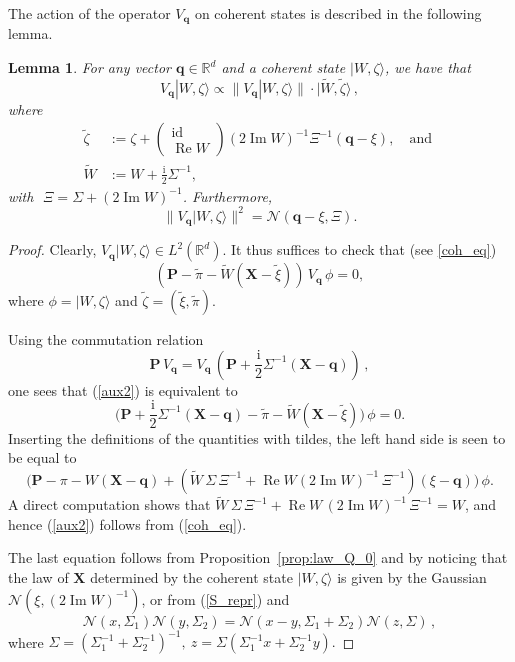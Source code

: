\documentclass[11pt]{article}
\newtheorem{lemma}[theorem]{Lemma}
\newcommand{\ket}[1]{|{#1}\rangle}
\renewcommand{\Re}{\operatorname{Re}}
\renewcommand{\Im}{\operatorname{Im}}
\renewcommand\i{\mathrm{i}}
\newcommand{\iu}{{\mathrm i}}
\newcommand{\id}{\mathrm{id}}
\begin{document}
The action of the operator $V_{\mathbf q}$ on coherent states is described in the following lemma.
\begin{lemma}
\label{qLemma}
For any vector $\mathbf q\in\mathbb R^d$ and a coherent state $\ket{W, \zeta}$, we have that
$$V_{\mathbf q} \ket{W, \zeta} \propto \|V_{\mathbf q} \ket{W, \zeta}\| \cdot \ket{\tilde{W}, \tilde{\zeta}}\,,$$ 
where
\begin{align*}
\tilde{\zeta}& :=  \zeta + \left(\begin{array}{c} \id \\ \Re W  \end{array} \right) (2\Im W)^{-1} \Xi^{-1}(\mathbf q-\xi), \quad \text{and }\\
 \tilde{W} &:= W + \frac{\iu}{2}\Sigma^{-1},
\end{align*}
with\,\, $\Xi = \Sigma + (2 \Im W)^{-1}$. Furthermore,
$$
\|V_{\mathbf q} \ket{W, \zeta}\|^2 = \mathcal{N}(\mathbf q - \xi, \Xi).
$$
\end{lemma}
\begin{proof}
Clearly, $V_{\mathbf q} \ket{W, \zeta} \in L^2(\mathbb R^d)$. It thus suffices to check  that (see \eqref{coh_eq})
\begin{equation}
\label{aux2}
(\mathbf P - \tilde{\pi} - \tilde{W}(\mathbf X - \tilde{\xi})) \, V_{\mathbf q}\, \phi = 0,
\end{equation}
where $\phi=\ket{ W, \zeta}$ and $\tilde\zeta=(\tilde\xi,\tilde\pi)$.

Using the commutation relation $$\mathbf P\, V_{\mathbf q} = V_{\mathbf q}\, (\mathbf P + \frac{\i}{2}\Sigma^{-1}(\mathbf X - \mathbf q))\,,$$ 
one sees that (\ref{aux2}) is equivalent to 
$$
\Big(\mathbf P + \frac{\i}{2}\Sigma^{-1}(\mathbf X -\mathbf q) - \tilde{\pi} - \tilde{W} (\mathbf X - \tilde{\xi})\Big)\, \phi =  0.
$$
Inserting the definitions of the quantities with tildes, the left hand side is seen to be equal to
$$
\Big(\mathbf P - \pi - W(\mathbf X- \mathbf q) + (\tilde{W}\, \Sigma\,\Xi^{-1}+ \Re W(2\Im W)^{-1}\,\Xi^{-1}) (\xi - \mathbf q)\Big) \,\phi.
$$
A direct computation shows that $ \tilde{W}\, \Sigma\, \Xi^{-1}+ \Re W\,(2\Im W)^{-1}\,\Xi^{-1} = W$, and hence (\ref{aux2}) follows from (\ref{coh_eq}).

The last equation follows from Proposition~\ref{prop:law_Q_0} and by noticing that the law of $\mathbf X$ determined by the coherent state $\ket{W,\zeta}$ is given by the Gaussian $\mathcal N(\xi,(2\Im W)^{-1})$, or from (\ref{S_repr}) and 
\begin{equation*}
\mathcal{N}(x, \Sigma_1) \mathcal{N}(y, \Sigma_2) = \mathcal{N}(x-y, \Sigma_1 + \Sigma_2) \mathcal{N}(z, \Sigma)\,,
\end{equation*}
where 
$
\Sigma = (\Sigma_1^{-1} + \Sigma_2^{-1})^{-1},\ z = \Sigma (\Sigma_1^{-1} x + \Sigma_2^{-1}y).
$
\end{proof}
\end{document}
